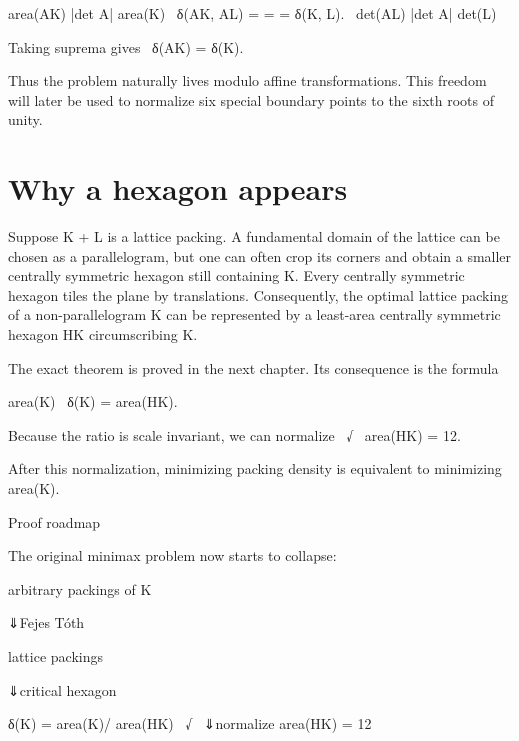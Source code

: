 \begin{displaytext}
area(AK) |det A| area(K) \
δ(AK, AL) = = = δ(K, L). \
det(AL) |det A| det(L)
\end{displaytext}

\begin{displaytext}
Taking suprema gives \
δ(AK) = δ(K).
\end{displaytext}

Thus the problem naturally lives modulo affine transformations. This freedom will later be used to normalize six special boundary points to the sixth roots of unity.


\section{Why a hexagon appears}

Suppose K + L is a lattice packing. A fundamental domain of the lattice can be chosen as a parallelogram, but one can often crop its corners and obtain a smaller centrally symmetric hexagon still containing K. Every centrally symmetric hexagon tiles the plane by translations. Consequently, the optimal lattice packing of a non-parallelogram K can be represented by a least-area centrally symmetric hexagon HK circumscribing K.


The exact theorem is proved in the next chapter. Its consequence is the formula


\begin{displaytext}
area(K) \
δ(K) = area(HK).
\end{displaytext}

\begin{displaytext}
Because the ratio is scale invariant, we can normalize \
√ \
area(HK) = 12.
\end{displaytext}

After this normalization, minimizing packing density is equivalent to minimizing area(K).


\begin{insightbox}{Proof roadmap}
\end{insightbox}

The original minimax problem now starts to collapse:


arbitrary packings of K


⇓Fejes Tóth


lattice packings


⇓critical hexagon


\begin{displaytext}
δ(K) = area(K)/ area(HK) \
√ \
⇓normalize area(HK) = 12
\end{displaytext}

